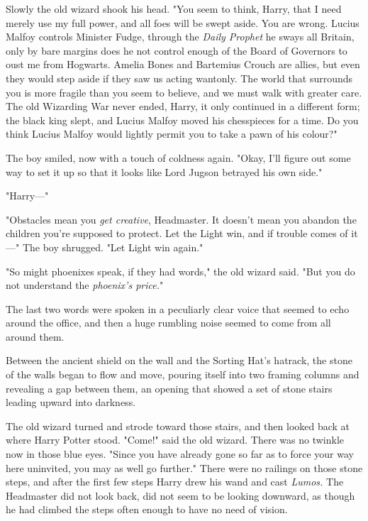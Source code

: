 Slowly the old wizard shook his head. "You seem to think, Harry, that I need
merely use my full power, and all foes will be swept aside. You are wrong.
Lucius Malfoy controls Minister Fudge, through the \emph{Daily Prophet} he
sways all Britain, only by bare margins does he not control enough of the Board
of Governors to oust me from Hogwarts. Amelia Bones and Bartemius Crouch are
allies, but even they would step aside if they saw us acting wantonly. The
world that surrounds you is more fragile than you seem to believe, and we must
walk with greater care. The old Wizarding War never ended, Harry, it only
continued in a different form; the black king slept, and Lucius Malfoy moved
his chesspieces for a time. Do you think Lucius Malfoy would lightly permit you
to take a pawn of his colour?"

The boy smiled, now with a touch of coldness again. "Okay, I'll figure out some
way to set it up so that it looks like Lord Jugson betrayed his own side."

"Harry---"

"Obstacles mean you \emph{get creative}, Headmaster. It doesn't mean you
abandon the children you're supposed to protect. Let the Light win, and if
trouble comes of it---" The boy shrugged. "Let Light win again."

"So might phoenixes speak, if they had words," the old wizard said. "But you do
not understand the \emph{phoenix's price.}"

The last two words were spoken in a peculiarly clear voice that seemed to echo
around the office, and then a huge rumbling noise seemed to come from all
around them.

Between the ancient shield on the wall and the Sorting Hat's hatrack, the stone
of the walls began to flow and move, pouring itself into two framing columns
and revealing a gap between them, an opening that showed a set of stone stairs
leading upward into darkness.

The old wizard turned and strode toward those stairs, and then looked back at
where Harry Potter stood. "Come!" said the old wizard. There was no twinkle now
in those blue eyes. "Since you have already gone so far as to force your way
here uninvited, you may as well go further."
\later
There were no railings on those stone steps, and after the first few steps
Harry drew his wand and cast \emph{Lumos.} The Headmaster did not look back,
did not seem to be looking downward, as though he had climbed the steps often
enough to have no need of vision.

